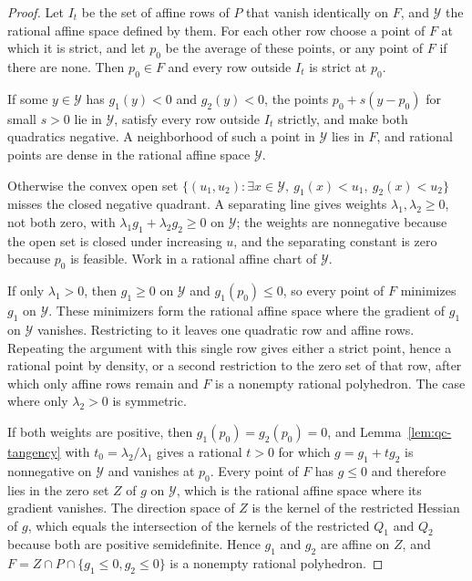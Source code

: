 \begin{proof}
Let $I_t$ be the set of affine rows of $P$ that vanish identically on $F$, and
$\mathcal Y$ the rational affine space defined by them. For each other row choose
a point of $F$ at which it is strict, and let $p_0$ be the average of these
points, or any point of $F$ if there are none. Then $p_0\in F$ and every row
outside $I_t$ is strict at $p_0$.

If some $y\in\mathcal Y$ has $g_1(y)<0$ and $g_2(y)<0$, the points
$p_0+s(y-p_0)$ for small $s>0$ lie in $\mathcal Y$, satisfy every row outside
$I_t$ strictly, and make both quadratics negative. A neighborhood of such a
point in $\mathcal Y$ lies in $F$, and rational points are dense in the rational
affine space $\mathcal Y$.

Otherwise the convex open set
$\{(u_1,u_2):\exists x\in\mathcal Y,\ g_1(x)<u_1,\ g_2(x)<u_2\}$ misses the
closed negative quadrant. A separating line gives weights
$\lambda_1,\lambda_2\ge0$, not both zero, with $\lambda_1g_1+\lambda_2g_2\ge0$
on $\mathcal Y$; the weights are nonnegative because the open set is closed under
increasing $u$, and the separating constant is zero because $p_0$ is feasible.
Work in a rational affine chart of $\mathcal Y$.

If only $\lambda_1>0$, then $g_1\ge0$ on $\mathcal Y$ and $g_1(p_0)\le0$, so
every point of $F$ minimizes $g_1$ on $\mathcal Y$. These minimizers form the
rational affine space where the gradient of $g_1$ on $\mathcal Y$ vanishes.
Restricting to it leaves one quadratic row and affine rows. Repeating the
argument with this single row gives either a strict point, hence a rational
point by density, or a second restriction to the zero set of that row, after
which only affine rows remain and $F$ is a nonempty rational polyhedron. The
case where only $\lambda_2>0$ is symmetric.

If both weights are positive, then $g_1(p_0)=g_2(p_0)=0$, and
Lemma~\ref{lem:qc-tangency} with $t_0=\lambda_2/\lambda_1$ gives a rational
$t>0$ for which $g=g_1+tg_2$ is nonnegative on $\mathcal Y$ and vanishes at
$p_0$. Every point of $F$ has $g\le0$ and therefore lies in the zero set $Z$
of $g$ on $\mathcal Y$, which is the rational affine space where its gradient
vanishes. The direction space of $Z$ is the kernel of the restricted Hessian
of $g$, which equals the intersection of the kernels of the restricted $Q_1$
and $Q_2$ because both are positive semidefinite. Hence $g_1$ and $g_2$ are
affine on $Z$, and $F=Z\cap P\cap\{g_1\le0,g_2\le0\}$ is a nonempty rational
polyhedron.
\end{proof}


